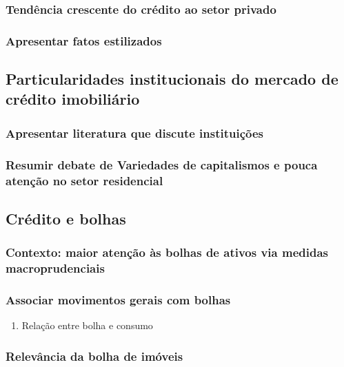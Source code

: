 \documentclass[11pt]{article}
\begin{document}
\subsubsection{Tendência crescente do crédito ao setor privado}
\label{sec:org3c84195}

\subsubsection{Apresentar fatos estilizados}
\label{sec:orgfe8fa07}

\subsection{Particularidades institucionais do mercado de crédito imobiliário}
\label{sec:org193cce0}

\subsubsection{Apresentar literatura que discute instituições}
\label{sec:org7efe679}

\subsubsection{Resumir debate de Variedades de capitalismos e pouca atenção no setor residencial}
\label{sec:org9642304}

\subsection{Crédito e bolhas}
\label{sec:orge92daa3}
\subsubsection{Contexto: maior atenção às bolhas de ativos via medidas macroprudenciais}
\label{sec:orgc0364e9}
\subsubsection{Associar movimentos gerais com bolhas}
\label{sec:orgebcb26b}

\begin{enumerate}
\item Relação entre bolha e consumo
\label{sec:orge545492}
\end{enumerate}

\subsubsection{Relevância da bolha de imóveis}
\label{sec:orgc187d7a}
\end{document}
